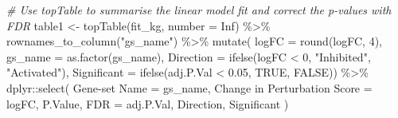 \documentclass[9pt,a4paper,]{extarticle}
\newenvironment{Shaded}{\begin{snugshade}}{\end{snugshade}}
\newcommand{\AttributeTok}[1]{\textcolor[rgb]{0.77,0.63,0.00}{#1}}
\newcommand{\CommentTok}[1]{\textcolor[rgb]{0.56,0.35,0.01}{\textit{#1}}}
\newcommand{\ConstantTok}[1]{\textcolor[rgb]{0.00,0.00,0.00}{#1}}
\newcommand{\DecValTok}[1]{\textcolor[rgb]{0.00,0.00,0.81}{#1}}
\newcommand{\FloatTok}[1]{\textcolor[rgb]{0.00,0.00,0.81}{#1}}
\newcommand{\FunctionTok}[1]{\textcolor[rgb]{0.00,0.00,0.00}{#1}}
\newcommand{\NormalTok}[1]{#1}
\newcommand{\OtherTok}[1]{\textcolor[rgb]{0.56,0.35,0.01}{#1}}
\newcommand{\SpecialCharTok}[1]{\textcolor[rgb]{0.00,0.00,0.00}{#1}}
\newcommand{\StringTok}[1]{\textcolor[rgb]{0.31,0.60,0.02}{#1}}
\begin{document}
\begin{Shaded}
\begin{Highlighting}[]
\CommentTok{\# Use topTable to summarise the linear model fit and correct the p{-}values with FDR}
\NormalTok{table1 }\OtherTok{\textless{}{-}} \FunctionTok{topTable}\NormalTok{(fit\_kg,}
                   \AttributeTok{number =} \ConstantTok{Inf}\NormalTok{) }\SpecialCharTok{\%\textgreater{}\%}
    \FunctionTok{rownames\_to\_column}\NormalTok{(}\StringTok{"gs\_name"}\NormalTok{) }\SpecialCharTok{\%\textgreater{}\%}
    \FunctionTok{mutate}\NormalTok{(}
        \AttributeTok{logFC =} \FunctionTok{round}\NormalTok{(logFC, }\DecValTok{4}\NormalTok{),}
        \AttributeTok{gs\_name =} \FunctionTok{as.factor}\NormalTok{(gs\_name),}
        \AttributeTok{Direction =} \FunctionTok{ifelse}\NormalTok{(logFC }\SpecialCharTok{\textless{}} \DecValTok{0}\NormalTok{, }\StringTok{"Inhibited"}\NormalTok{, }\StringTok{"Activated"}\NormalTok{),}
        \AttributeTok{Significant =} \FunctionTok{ifelse}\NormalTok{(adj.P.Val }\SpecialCharTok{\textless{}} \FloatTok{0.05}\NormalTok{, }\ConstantTok{TRUE}\NormalTok{, }\ConstantTok{FALSE}\NormalTok{)) }\SpecialCharTok{\%\textgreater{}\%}
\NormalTok{    dplyr}\SpecialCharTok{::}\FunctionTok{select}\NormalTok{(}
        \StringTok{\textasciigrave{}}\AttributeTok{Gene{-}set Name}\StringTok{\textasciigrave{}} \OtherTok{=}\NormalTok{ gs\_name, }\StringTok{\textasciigrave{}}\AttributeTok{Change in Perturbation Score}\StringTok{\textasciigrave{}} \OtherTok{=}\NormalTok{ logFC, }
\NormalTok{        P.Value, }\AttributeTok{FDR =}\NormalTok{ adj.P.Val, Direction, Significant}
\NormalTok{    )}
\end{Highlighting}
\end{Shaded}
\end{document}

